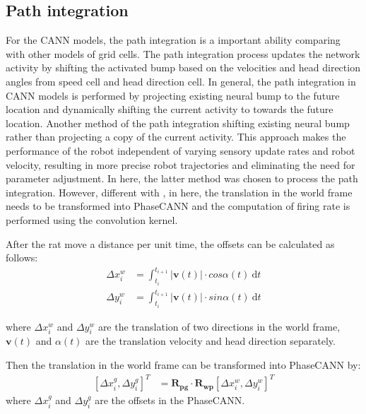 \documentclass[final,5p,times,twocolumn]{elsarticle}
\begin{document}
\subsection{Path integration}

For the CANN models, the path integration is a important ability comparing with other models of grid cells. The path integration process updates the network activity by shifting the activated bump based on the velocities and head direction angles from speed cell\citep{Kropff2015} and head direction cell\citep{Zhang1996,Taube1990}. In general, the path integration in CANN models is performed by projecting existing neural bump to the future location and dynamically shifting the current activity to towards the future location. Another method of the path integration shifting existing neural bump rather than projecting a copy of the current activity. This approach makes the performance of the robot independent of varying sensory update rates and robot velocity, resulting in more precise robot trajectories and eliminating the need for parameter adjustment\citep{Milford2008d}. In here, the latter method was chosen to process the path integration. However, different with \citep{Milford2008d}, in here, the translation in the world frame needs to be transformed into PhaseCANN and the computation of firing rate is performed using the convolution kernel.

After the rat move a distance per unit time, the offsets can be calculated as follows:
\begin{equation}\label{eq:offsets}
	\begin{aligned}
		\Delta x^w_i &= \int_{t_{i}}^{t_{i+1}}|\bm{v}(t)| \cdot cos\alpha(t) \ \text{d}t	\\
		\Delta y^w_i &= \int_{t_{i}}^{t_{i+1}}|\bm{v}(t)| \cdot sin\alpha(t) \ \text{d}t
	\end{aligned}
\end{equation}

where $\Delta x^w_i$ and $\Delta y^w_i$ are the translation of two directions in the world frame, $\bm{v}(t)$ and $\alpha(t)$ are the translation velocity and head direction separately.

Then the translation in the world frame can be transformed into PhaseCANN by:
\begin{align}\label{eq:trans_w2g}	
	[\Delta x^g_i,\Delta y^g_i]^T &= \bm{R_{pg}}\cdot \bm{R_{wp}} [\Delta x^w_i,\Delta y^w_i]^T 
\end{align}
where $\Delta x^g_i$ and $\Delta y^g_i$ are the offsets in the PhaseCANN.
\end{document}
